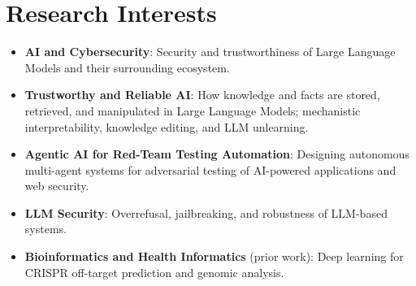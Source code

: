 \section{Research Interests}

\begin{itemize}
    \item \textbf{AI and Cybersecurity}: Security and trustworthiness of Large Language Models and their surrounding ecosystem.
    \item \textbf{Trustworthy and Reliable AI}: How knowledge and facts are stored, retrieved, and manipulated in Large Language Models; mechanistic interpretability, knowledge editing, and LLM unlearning.
    \item \textbf{Agentic AI for Red-Team Testing Automation}: Designing autonomous multi-agent systems for adversarial testing of AI-powered applications and web security.
    \item \textbf{LLM Security}: Overrefusal, jailbreaking, and robustness of LLM-based systems.
    \item \textbf{Bioinformatics and Health Informatics} (prior work): Deep learning for CRISPR off-target prediction and genomic analysis.
\end{itemize}
\endinput
